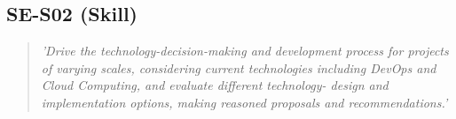 \subsection{SE-S02 (Skill)}

  \begin{quote}
    \textit{'Drive the technology-decision-making and
    development process for projects of varying scales,
    considering current technologies including DevOps and
    Cloud Computing, and evaluate different technology-
    design and implementation options, making reasoned
    proposals and recommendations.'}
  \end{quote}

\newpage